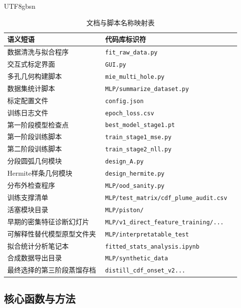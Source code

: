 \documentclass[english, 12pt, a4paper, elec, utf8, a-2b, online]{aaltothesis}
\DeclareRobustCommand{\codepath}[1]{\nolinkurl{#1}}
\begin{document}
\begin{CJK*}{UTF8}{gbsn}
\begin{table}[h]
\centering
\begin{tabular}{p{0.4\linewidth} p{0.55\linewidth}}
\toprule
\textbf{语义短语} & \textbf{代码库标识符} \\
\midrule
数据清洗与拟合程序 & \texttt{fit\_raw\_data.py} \\
交互式标定界面 & \texttt{GUI.py} \\
多孔几何构建脚本 & \codepath{mie\_multi\_hole.py} \\
数据集统计脚本 & \texttt{MLP/summarize\_dataset.py} \\
标定配置文件 & \texttt{config.json} \\
训练日志文件 & \codepath{epoch\_loss.csv} \\
第一阶段模型检查点 & \codepath{best\_model\_stage1.pt} \\
第一阶段训练脚本 & \texttt{train\_stage1\_mse.py} \\
第二阶段训练脚本 & \texttt{train\_stage2\_nll.py} \\
分段圆弧几何模块 & \codepath{design\_A.py} \\
Hermite样条几何模块 & \codepath{design\_hermite.py} \\
分布外检查程序 & \codepath{MLP/ood\_sanity.py} \\
训练支撑清单 & \codepath{MLP/test\_matrix/cdf\_plume\_audit.csv} \\
活塞模块目录 & \codepath{MLP/piston/} \\
早期的密集特征诊断幻灯片 & \codepath{MLP/v1\_direct\_feature\_training/...} \\
可解释性替代模型原型文件夹 & \codepath{MLP/interpretatable\_test} \\
拟合统计分析笔记本 & \texttt{fitted\_stats\_analysis.ipynb} \\
合成数据导出目录 & \codepath{MLP/synthetic\_data} \\
最终选择的第三阶段蒸馏存档 & \codepath{distill\_cdf\_onset\_v2...} \\
\bottomrule
\end{tabular}
\caption{文档与脚本名称映射表}
\end{table}

\subsection{核心函数与方法}


\end{CJK*}
\end{document}
